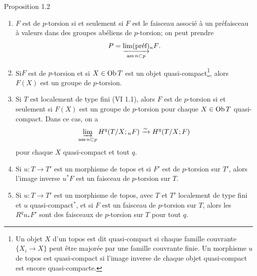 \documentclass[10pt]{../fichiers-configuration-latex/smfart}
\begin{document}
\begin{enonce*}{Proposition 1.2}
\begin{enumerate}
\renewcommand{\theenumi}{\roman{enumi}}
\renewcommand{\labelenumi}{(\theenumi)}
\item $F$ est de $p$-torsion si et seulement si $F$ est le faisceau
  associé à un préfaisceau à valeurs dans des groupes abéliens de
  $p$-torsion; on peut prendre
$$
P=\underset{\operatorname{ass} n\subset p}{\underrightarrow{\lim(\text{\rm préf})}} {}_nF{}.
$$

\item Si\pageoriginale $F$ est de $p$-torsion et si $X\in \operatorname{Ob} T$ est
  un objet quasi-compact\footnote[1]{Un objet $X$ d'un topos est dit
  quasi-compact si chaque famille couvrante $\{X_i\rightarrow X\}$
  peut être majorée par une famille couvrante finie. Un morphisme $u$
  de topos est quasi-compact si l'image inverse de chaque objet
  quasi-compact est encore quasi-compacte.}, alors $F(X)$ est un
  groupe de $p$-torsion.

\item Si $T$ est localement de type fini {\rm (VI 1.1)}, alors $F$ est
  de $p$-torsion si et seulement si $F(X)$ est un groupe de
  $p$-torsion pour chaque $X\in \operatorname{Ob} T$ quasi-compact. Dans ce cas, on
  a
$$
\varinjlim_{\operatorname{ass} n\subset p} H^q(T/X; {}_nF)\xrightarrow{\sim}
H^q(T/X;F)
$$
pour chaque $X$ quasi-compact et tout $q$.

\item Si $u:T\rightarrow T'$ est un morphisme de topos et si $F'$ est
  de $p$-torsion sur $T'$, alors l'image inverse $u^{\ast}F$ est un
  faisceau de $p$-torsion sur $T$.

\item Si $u:T\rightarrow T'$ est un morphisme de topos, avec $T$ et
  $T'$ localement de type fini et $u$ quasi-compact${}^\ast$, et si $F$ est un faisceau de $p$-torsion sur $T$, alors
  les $R^qu_{\ast}F'$ sont des faisceaux de $p$-torsion sur $T$ pour
  tout $q$.
\end{enumerate}
\end{enonce*}
\end{document}

